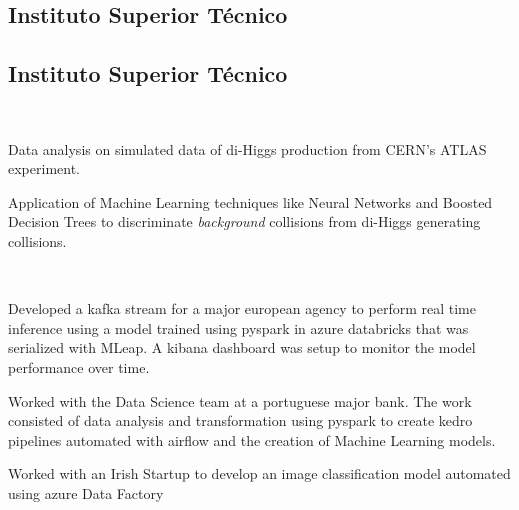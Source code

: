 \documentclass[a4paper]{MagicalCV}
\begin{document}
\hfill
\begin{minipage}[t]{0.64\textwidth} 


\subsection{Instituto Superior Técnico}
\vspace{\topsep} %
\sectionsep

\subsection{Instituto Superior Técnico}
\sectionsep


 \\
\vspace{\topsep} %
\begin{tightemize}
    \item Data analysis on simulated data of di-Higgs production from CERN's ATLAS experiment.
    \item Application of Machine Learning techniques like Neural Networks and Boosted Decision Trees to discriminate \textit{background} collisions from di-Higgs generating collisions.
\end{tightemize}
\sectionsep

 \\
\vspace{\topsep} %
\begin{tightemize}
    \item Developed a kafka stream for a major european agency to perform real time inference using a model trained using pyspark in azure databricks that was serialized with MLeap. A kibana dashboard was setup to monitor the model performance over time.
    \item Worked with the Data Science team at a portuguese major bank. The work consisted of data analysis and transformation using pyspark to create kedro pipelines automated with airflow and the creation of Machine Learning models.
    \item Worked with an Irish Startup to develop an image classification model automated using azure Data Factory
\end{tightemize}
\sectionsep


\end{minipage}
\end{document}
